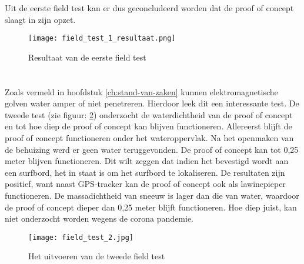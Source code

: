 \newline
Uit de eerste field test kan er dus geconcludeerd worden dat de proof of concept slaagt in zijn opzet.
\begin{figure}
	\texttt{[image: field\_test\_1\_resultaat.png]}
	\caption{Resultaat van de eerste field test}
	\label{fig:field_test_1_resultaat}
\end{figure}
\section{}
Zoals vermeld in hoofdstuk \ref{ch:stand-van-zaken} kunnen elektromagnetische golven water amper of niet penetreren. Hierdoor leek dit een interessante test.
\newline
De tweede test (zie figuur: \ref{fig:field_test_2}) onderzocht de waterdichtheid van de proof of concept en tot hoe diep de proof of concept kan blijven functioneren. Allereerst blijft de proof of concept functioneren onder het wateroppervlak. Na het openmaken van de behuizing werd er geen water teruggevonden.
\newline
De proof of concept kan tot 0,25 meter blijven functioneren. Dit wilt zeggen dat indien het bevestigd wordt aan een surfbord, het in staat is om het surfbord te lokaliseren. De resultaten zijn positief, want naast GPS-tracker kan de proof of concept ook als lawinepieper functioneren. De massadichtheid van sneeuw is lager dan die van water, waardoor de proof of concept dieper dan 0,25 meter blijft functioneren. Hoe diep juist, kan niet onderzocht worden wegens de corona pandemie. 
\begin{figure}
	\texttt{[image: field\_test\_2.jpg]}
	\caption{Het uitvoeren van de tweede field test}
	\label{fig:field_test_2}
\end{figure}